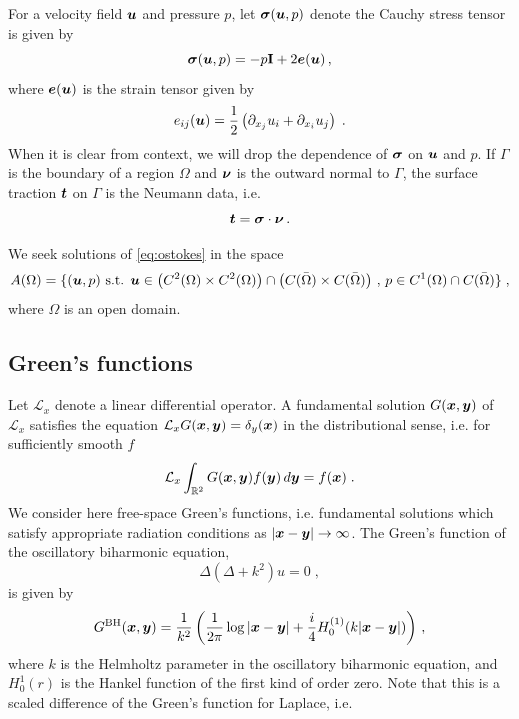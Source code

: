 For a velocity field ${\boldsymbol u}$ and pressure $p$, let ${\boldsymbol \sigma}({\boldsymbol u},p)$
denote the Cauchy stress tensor is given by
\begin{equation}
{\boldsymbol \sigma}({\boldsymbol u},p) = -p {\bf I} + 2 {\boldsymbol e}({\boldsymbol u}) \, ,
\end{equation}
where ${\boldsymbol e}({\boldsymbol u})$ is the strain tensor given by
\begin{equation}
e_{ij}({\boldsymbol u}) = \frac{1}{2} \left( \partial_{x_j} u_i + \partial_{x_i} u_j \right) \; .
\end{equation}
When it is clear from context, we will drop the dependence of
${\boldsymbol \sigma}$ on ${\boldsymbol u}$ and $p$.
If $\Gamma$ is the boundary of a region $\Omega$ and ${\boldsymbol \nu}$ is the outward
normal to $\Gamma$, the surface traction ${\boldsymbol t}$ on $\Gamma$ 
is the Neumann data, i.e. 
\begin{equation}
{\boldsymbol t} = {\boldsymbol \sigma} \cdot {\boldsymbol \nu} \, .
\end{equation}

We seek solutions of \cref{eq:ostokes} in the space
\begin{equation}
  A(\Omega) = \{ ({\boldsymbol u},p) \textrm{ s.t. } {\boldsymbol u} \in
  \left ( C^2(\Omega)\times C^2(\Omega) \right ) \cap
  \left ( C(\bar{\Omega}) \times C(\bar{\Omega}) \right ) \, , \,
  p \in C^1(\Omega) \cap C(\bar{\Omega})\} \; ,
\end{equation}
where $\Omega$ is an open domain.

\subsection{Green's functions}

Let $\mathcal{L}_x$ denote a linear differential operator. A fundamental
solution $G({\boldsymbol x},{\boldsymbol y})$ of $\mathcal{L}_x$ satisfies the equation
$\mathcal{L}_x G({\boldsymbol x},{\boldsymbol y}) = \delta_y({\boldsymbol x})$ in the distributional sense, i.e.
for sufficiently smooth $f$
\begin{equation}
  \mathcal{L}_x \int_{\mathbb{R}^2} G({\boldsymbol x},{\boldsymbol y}) f({\boldsymbol y}) \, d {\boldsymbol y} = f({\boldsymbol x}) \; .
  \nonumber
\end{equation}
We consider here
free-space Green's functions, i.e. fundamental solutions which satisfy appropriate
radiation conditions as $|{\boldsymbol x}-{\boldsymbol y}| \to \infty$.
The Green's function of the oscillatory biharmonic equation,
\begin{equation}
  \Delta ( \Delta + k^2 ) u = 0 \; , \label{eq:obiharm} \nonumber
\end{equation}
is given by 
\begin{equation}
  G^{\textrm{BH}}({\boldsymbol x},{\boldsymbol y}) = \frac{1}{k^2}
  \left (\frac{1}{2\pi} \log |{\boldsymbol x}-{\boldsymbol y}| +
  \frac{i}{4} H_0^{(1)}(k|{\boldsymbol x}-{\boldsymbol y}|) \right ) \, ,
  \label{eq:Gbh}
\end{equation}
where $k$ is the Helmholtz parameter in the oscillatory biharmonic equation,
and $H_{0}^{1}(r)$ is the Hankel function of the first kind of order zero.
Note that this is a scaled difference of the Green's function for
Laplace, i.e.

